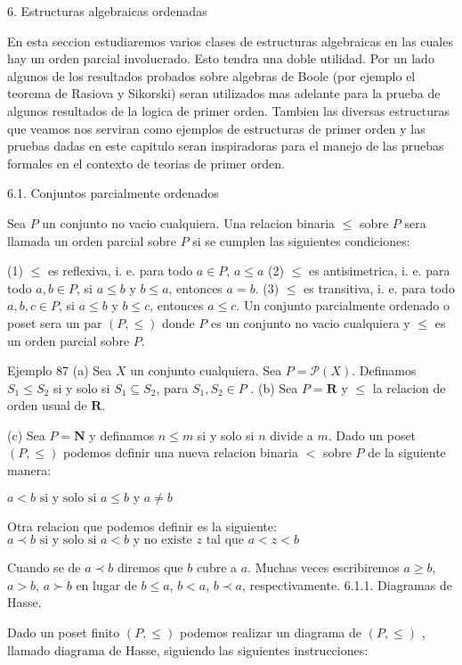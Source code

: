 6. Estructuras algebraicas ordenadas

En esta seccion estudiaremos varios clases de estructuras algebraicas en las cuales hay un orden parcial involucrado. Esto tendra una doble utilidad. Por un lado algunos de los resultados probados sobre algebras de Boole (por ejemplo el teorema de Rasiova y Sikorski) seran utilizados mas adelante para la prueba de algunos resultados de la logica de primer orden. Tambien las diversas estructuras que veamos nos serviran como ejemplos de estructuras de primer orden y las pruebas dadas en este capitulo seran inspiradoras para el manejo de las pruebas formales en el contexto de teorias de primer orden.

6.1. Conjuntos parcialmente ordenados

Sea \(P\) un conjunto no vacio cualquiera. Una relacion binaria \(\leq \) sobre \( P\) sera llamada un orden parcial sobre \(P\) si se cumplen las siguientes condiciones:

(1) \(\leq \) es reflexiva, i. e. para todo \(a\in P\), \(a\leq a\)
(2) \(\leq \) es antisimetrica, i. e. para todo \(a,b\in P\), si \(a\leq b\) y \(b\leq a\), entonces \(a=b.\)
(3) \(\leq \) es transitiva, i. e. para todo \(a,b,c\in P\), si \(a\leq b\) y \(b\leq c\), entonces \(a\leq c\).
Un conjunto parcialmente ordenado o poset sera un par \((P,\leq )\) donde \(P\) es un conjunto no vacio cualquiera y \(\leq \) es un orden parcial sobre \(P\).

Ejemplo 87 (a) Sea \(X\) un conjunto cualquiera. Sea \(P=\mathcal{P}(X)\). Definamos \( S_{1}\leq S_{2}\) si y solo si \(S_{1}\subseteq S_{2}\), para \(S_{1},S_{2}\in P\) .
(b) Sea \(P=\mathbf{R}\) y \(\leq \) la relacion de orden usual de \(\mathbf{R}\).

(c) Sea \(P=\mathbf{N}\) y definamos \(n\leq m\) si y solo si \(n\) divide a \(m\).
Dado un poset \((P,\leq )\) podemos definir una nueva relacion binaria \(< \) sobre \(P\) de la siguiente manera:

\(\displaystyle a< b\text{ si y solo si }a\leq b\text{ y }a\neq b \)

Otra relacion que podemos definir es la siguiente:
\(\displaystyle a\prec b\text{ si y solo si }a< b\text{ y no existe }z\text{ tal que }a< z< b \)

Cuando se de \(a\prec b\) diremos que \(b\) cubre a \(a\). Muchas veces escribiremos \(a\geq b\), \(a >b\), \(a\succ b\) en lugar de \(b\leq a\), \(b< a\), \( b\prec a\), respectivamente.
6.1.1. Diagramas de Hasse.

Dado un poset finito \((P,\leq )\) podemos realizar un diagrama de \((P,\leq )\) , llamado diagrama de Hasse, siguiendo las siguientes instrucciones:

